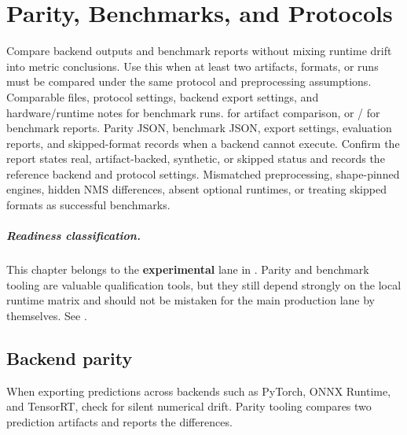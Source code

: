 \chapter{Parity, Benchmarks, and Protocols}
\label{chap:parity-benchmarks}


\WorkflowOpening
{Compare backend outputs and benchmark reports without mixing runtime drift into metric conclusions.}
{Use this when at least two artifacts, formats, or runs must be compared under the same protocol and preprocessing assumptions.}
{Comparable  files, protocol settings, backend export settings, and hardware/runtime notes for benchmark runs.}
{ for artifact comparison, or  /  for benchmark reports.}
{Parity JSON, benchmark JSON, export settings, evaluation reports, and skipped-format records when a backend cannot execute.}
{Confirm the report states real, artifact-backed, synthetic, or skipped status and records the reference backend and protocol settings.}
{Mismatched preprocessing, shape-pinned engines, hidden NMS differences, absent optional runtimes, or treating skipped formats as successful benchmarks.}

\paragraph{Readiness classification.}
This chapter belongs to the \textbf{experimental} lane in \yolozu{}.
Parity and benchmark tooling are valuable qualification tools, but they still depend strongly on the local runtime matrix and should not be mistaken for the main production lane by themselves.
See .


\section{Backend parity}
When exporting predictions across backends such as PyTorch, ONNX Runtime, and TensorRT, check for silent numerical drift. Parity tooling compares two prediction artifacts and reports the differences.

